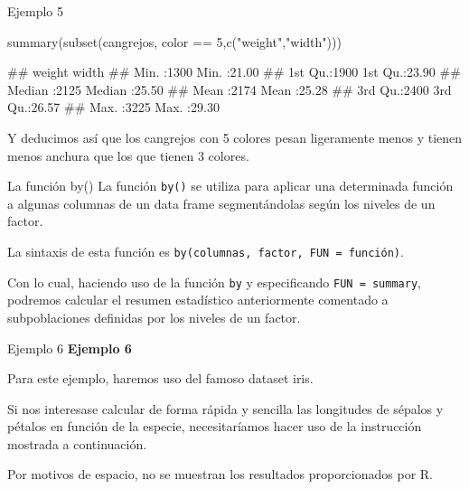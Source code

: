 \documentclass[
  ignorenonframetext,
  aspectratio=169]{beamer}
\newenvironment{Shaded}{\begin{snugshade}}{\end{snugshade}}
\newcommand{\AttributeTok}[1]{\textcolor[rgb]{0.77,0.63,0.00}{#1}}
\newcommand{\DecValTok}[1]{\textcolor[rgb]{0.00,0.00,0.81}{#1}}
\newcommand{\FunctionTok}[1]{\textcolor[rgb]{0.00,0.00,0.00}{#1}}
\newcommand{\NormalTok}[1]{#1}
\newcommand{\SpecialCharTok}[1]{\textcolor[rgb]{0.00,0.00,0.00}{#1}}
\newcommand{\StringTok}[1]{\textcolor[rgb]{0.31,0.60,0.02}{#1}}
\let\oldverbatim\verbatim
\let\endoldverbatim\endverbatim
\renewenvironment{verbatim}{\tiny\oldverbatim}{\endoldverbatim}
\begin{document}
\begin{frame}[fragile]{Ejemplo 5}
\protect\hypertarget{ejemplo-5-2}{}
\begin{Shaded}
\begin{Highlighting}[]
\FunctionTok{summary}\NormalTok{(}\FunctionTok{subset}\NormalTok{(cangrejos, color }\SpecialCharTok{==} \DecValTok{5}\NormalTok{,}\FunctionTok{c}\NormalTok{(}\StringTok{"weight"}\NormalTok{,}\StringTok{"width"}\NormalTok{)))}
\end{Highlighting}
\end{Shaded}

\begin{verbatim}
##      weight         width      
##  Min.   :1300   Min.   :21.00  
##  1st Qu.:1900   1st Qu.:23.90  
##  Median :2125   Median :25.50  
##  Mean   :2174   Mean   :25.28  
##  3rd Qu.:2400   3rd Qu.:26.57  
##  Max.   :3225   Max.   :29.30
\end{verbatim}

Y deducimos así que los cangrejos con 5 colores pesan ligeramente menos
y tienen menos anchura que los que tienen 3 colores.
\end{frame}

\begin{frame}[fragile]{La función by()}
\protect\hypertarget{la-funciuxf3n-by}{}
La función \texttt{by()} se utiliza para aplicar una determinada función
a algunas columnas de un data frame segmentándolas según los niveles de
un factor.

La sintaxis de esta función es
\texttt{by(columnas,\ factor,\ FUN\ =\ función)}.

Con lo cual, haciendo uso de la función \texttt{by} y especificando
\texttt{FUN\ =\ summary}, podremos calcular el resumen estadístico
anteriormente comentado a subpoblaciones definidas por los niveles de un
factor.
\end{frame}

\begin{frame}[fragile]{Ejemplo 6}
\protect\hypertarget{ejemplo-6}{}
\textbf{Ejemplo 6}

Para este ejemplo, haremos uso del famoso dataset iris.

Si nos interesase calcular de forma rápida y sencilla las longitudes de
sépalos y pétalos en función de la especie, necesitaríamos hacer uso de
la instrucción mostrada a continuación.

Por motivos de espacio, no se muestran los resultados proporcionados por
R.

\begin{Shaded}
\end{Shaded}
\end{frame}
\end{document}
